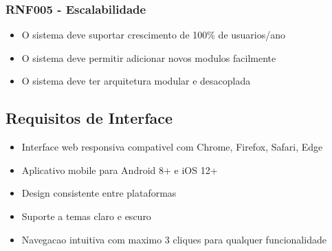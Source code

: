 \subsubsection{RNF005 - Escalabilidade}
\begin{itemize}
    \item O sistema deve suportar crescimento de 100\% de usuarios/ano
    \item O sistema deve permitir adicionar novos modulos facilmente
    \item O sistema deve ter arquitetura modular e desacoplada
\end{itemize}

\subsection{Requisitos de Interface}

\begin{itemize}
    \item Interface web responsiva compativel com Chrome, Firefox, Safari, Edge
    \item Aplicativo mobile para Android 8+ e iOS 12+
    \item Design consistente entre plataformas
    \item Suporte a temas claro e escuro
    \item Navegacao intuitiva com maximo 3 cliques para qualquer funcionalidade
\end{itemize}
